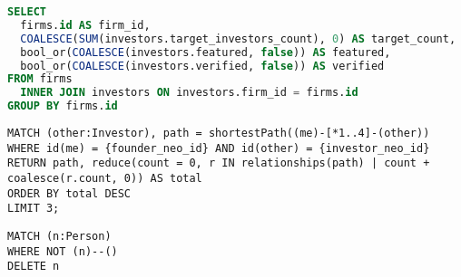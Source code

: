 \newpage

\begin{lstlisting}[frame=single,language=SQL,basicstyle=\footnotesize,columns=fullflexible,label={vcwiz:sql:view},caption={Denormalization of Individual Investor Properties}]
SELECT
  firms.id AS firm_id,
  COALESCE(SUM(investors.target_investors_count), 0) AS target_count,
  bool_or(COALESCE(investors.featured, false)) AS featured,
  bool_or(COALESCE(investors.verified, false)) AS verified
FROM firms
  INNER JOIN investors ON investors.firm_id = firms.id
GROUP BY firms.id
\end{lstlisting}

\begin{lstlisting}[frame=single,basicstyle=\footnotesize,columns=fullflexible,caption={Finding Intro Paths},label={vcwiz:cypher:intro}]
MATCH (other:Investor), path = shortestPath((me)-[*1..4]-(other))
WHERE id(me) = {founder_neo_id} AND id(other) = {investor_neo_id}
RETURN path, reduce(count = 0, r IN relationships(path) | count + coalesce(r.count, 0)) AS total
ORDER BY total DESC
LIMIT 3;
\end{lstlisting}

\begin{lstlisting}[frame=single,basicstyle=\footnotesize,columns=fullflexible,caption={Removing Orphans},label={vcwiz:cypher:orphans}]
MATCH (n:Person)
WHERE NOT (n)--()
DELETE n
\end{lstlisting}

\clearpage
\newpage
